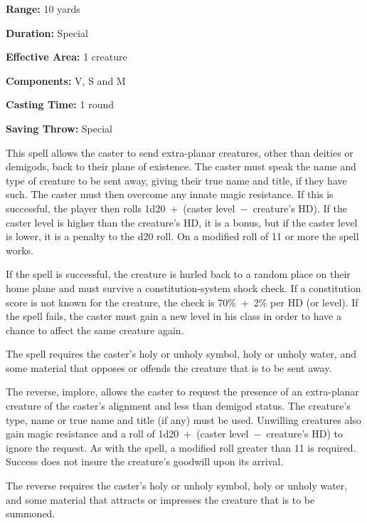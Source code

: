 \begin{multicols}{2}
\begin{minipage}{\columnwidth}
\noindent \textbf{Range:} 10 yards

\noindent \textbf{Duration:} Special

\noindent \textbf{Effective Area:} 1 creature

\noindent \textbf{Components:} V, S and M

\noindent \textbf{Casting Time:} 1 round

\noindent \textbf{Saving Throw:} Special

\end{minipage}

This spell allows the caster to send extra-planar creatures, other than deities or demigods, back to their plane of existence.  The caster must speak the name and type of creature to be sent away, giving their true name and title, if they have such.  The caster must then overcome any innate magic resistance.  If this is successful, the player then rolls 1d20~+~(caster level~$-$~creature's HD).  If the caster level is higher than the creature's HD, it is a bonus, but if the caster level is lower, it is a penalty to the d20 roll.  On a modified roll of 11 or more the spell works.

If the spell is successful, the creature is hurled back to a random place on their home plane and must survive a constitution-system shock check.  If a constitution score is not known for the creature, the check is 70\%~+~2\% per HD (or level).  If the spell fails, the caster must gain a new level in his class in order to have a chance to affect the same creature again.

The spell requires the caster's holy or unholy symbol, holy or unholy water, and some material that opposes or offends the creature that is to be sent away.

The reverse, implore, allows the caster to request the presence of an extra-planar creature of the caster's alignment and less than demigod status.  The creature's type, name or true name and title (if any) must be used.  Unwilling creatures also gain magic resistance and a roll of 1d20~+~(caster level~$-$~creature's HD) to ignore the request.  As with the spell, a modified roll greater than 11 is required.  Success does not insure the creature's goodwill upon its arrival.

The reverse requires the caster's holy or unholy symbol, holy or unholy water, and some material that attracts or impresses the creature that is to be summoned.

\vspace{1em}


\end{multicols}
